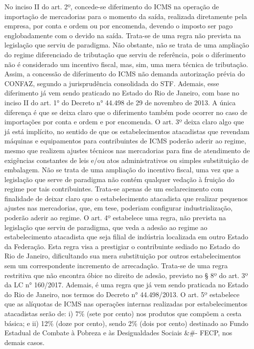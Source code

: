 \documentclass[10pt]{article}
\begin{document}
No inciso II do art. 2º, concede-se diferimento do ICMS na operação de importação de mercadorias para o momento da saída, realizada diretamente pela empresa, por conta e ordem ou por encomenda, devendo o imposto ser pago englobadamente com o devido na saída. 
Trata-se de uma regra não prevista na legislação que serviu de paradigma. Não obstante, não se trata de uma ampliação do regime diferenciado de tributação que serviu de referência, pois o diferimento não é considerado um incentivo fiscal, mas, sim, uma mera técnica de tributação. Assim, a concessão de diferimento do ICMS não demanda autorização prévia do CONFAZ, segundo a jurisprudência consolidada do STF.
Ademais, esse diferimento já vem sendo praticado no Estado do Rio de Janeiro, com base no inciso II do art. 1° do Decreto n° 44.498 de 29 de novembro de 2013. A única diferença é que se deixa claro que o diferimento também pode ocorrer no caso de importações por conta e ordem e por encomenda. 
O art. 3º deixa claro algo que já está implícito, no sentido de que os estabelecimentos atacadistas que revendam máquinas e equipamentos para contribuintes de ICMS poderão aderir ao regime, mesmo que realizem ajustes técnicos nas mercadorias para fins de atendimento de exigências constantes de leis e/ou atos administrativos ou simples substituição de embalagem. Não se trata de uma ampliação do incentivo fiscal, uma vez que a legislação que serve de paradigma não contém qualquer vedação à fruição do regime por tais contribuintes.  Trata-se apenas de um esclarecimento com finalidade de deixar claro que o estabelecimento atacadista que realizar pequenos ajustes nas mercadorias, que, em tese, poderiam configurar industrialização, poderão aderir ao regime.
O art. 4º estabelece uma regra, não prevista na legislação que serviu de paradigma, que veda a adesão ao regime ao estabelecimento atacadista que seja filial de indústria localizada em outro Estado da Federação. 
Esta regra visa a prestigiar o contribuinte sediado no Estado do Rio de Janeiro, dificultando sua mera substituição por outros estabelecimentos sem um correspondente incremento de arrecadação. Trata-se de uma regra restritiva que não encontra óbice no direito de adesão, previsto no § 8º do art. 3º da LC n° 160/2017. Ademais, é uma regra que já vem sendo praticada no Estado do Rio de Janeiro, nos termos do Decreto n° 44.498/2013. 
O art. 5º estabelece que as alíquotas de ICMS nas operações internas realizadas por estabelecimentos atacadistas serão de: i) 7\% (sete por cento) nos produtos que compõem a cesta básica; e ii) 12\% (doze por cento), sendo 2\% (dois por cento) destinado ao Fundo Estadual de Combate à Pobreza e às Desigualdades Sociais &#- FECP, nos demais casos. 
\end{document}
